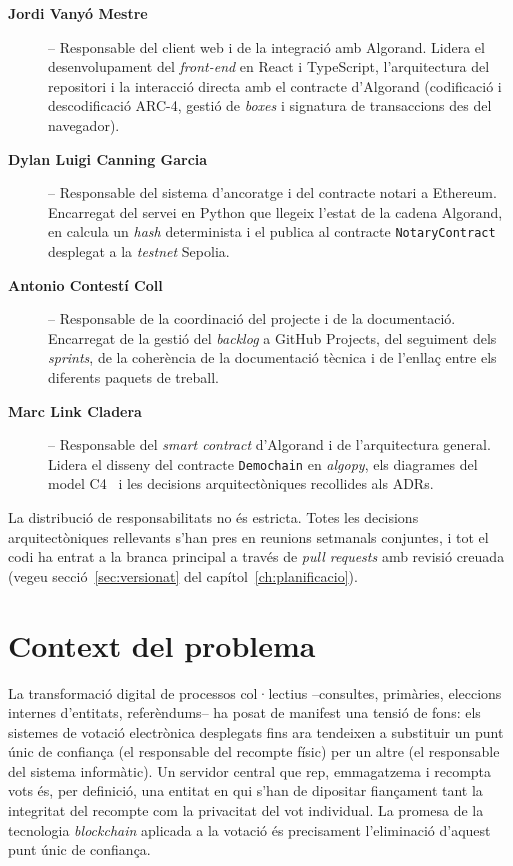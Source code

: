 \begin{description}
    \item[\textbf{Jordi Vanyó Mestre}] -- Responsable del client web i de la integració amb Algorand.
    Lidera el desenvolupament del \emph{\textit{front-end}} en React i TypeScript, l'arquitectura del repositori i la
    interacció directa amb el contracte d'Algorand (codificació i descodificació \ac{ARC}-4, gestió de \emph{boxes} i
    signatura de transaccions des del navegador).

    \item[\textbf{Dylan Luigi Canning Garcia}] -- Responsable del sistema d'ancoratge i del contracte notari a Ethereum.
    Encarregat del servei en Python que llegeix l'estat de la cadena Algorand, en calcula un \textit{hash} determinista
    i el publica al contracte \texttt{NotaryContract} desplegat a la \emph{testnet} Sepolia.

    \item[\textbf{Antonio Contestí Coll}] -- Responsable de la coordinació del projecte i de la documentació.
    Encarregat de la gestió del \emph{backlog} a GitHub Projects, del seguiment dels \emph{sprints}, de la coherència de
    la documentació tècnica i de l'enllaç entre els diferents paquets de treball.

    \item[\textbf{Marc Link Cladera}] -- Responsable del \emph{smart contract} d'Algorand i de l'arquitectura general.
    Lidera el disseny del contracte \texttt{Demochain} en \emph{algopy}, els diagrames del model C4~\cite{brown2018c4} i
    les decisions arquitectòniques recollides als \acp{ADR}.
\end{description}

La distribució de responsabilitats no és estricta.
Totes les decisions arquitectòniques rellevants s'han pres en reunions setmanals conjuntes, i tot el codi ha entrat a la
branca principal a través de \emph{pull requests} amb revisió creuada (vegeu secció~\ref{sec:versionat} del
capítol~\ref{ch:planificacio}).



\section{Context del problema}
\label{sec:context-problema}

La transformació digital de processos col·lectius --consultes, primàries, eleccions internes d'entitats, referèndums--
ha posat de manifest una tensió de fons: els sistemes de votació electrònica desplegats fins ara tendeixen a substituir
un punt únic de confiança (el responsable del recompte físic) per un altre (el responsable del sistema informàtic).
Un servidor central que rep, emmagatzema i recompta vots és, per definició, una entitat en qui s'han de dipositar
fiançament tant la integritat del recompte com la privacitat del vot individual.
La promesa de la tecnologia \emph{blockchain} aplicada a la votació és precisament l'eliminació d'aquest punt únic de
confiança.

